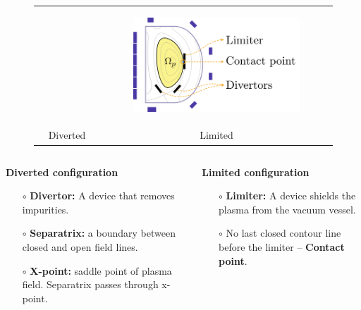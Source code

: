 \documentclass{beamer}
\begin{document}
\begin{frame}[t]
\begin{figure}[H]
\begin{tabular}{cc}
\begin{subfigure}{0.4\textwidth}
        \end{subfigure}
        &
        \begin{subfigure}{0.4\textwidth}
            \includegraphics[height=0.45\linewidth]{ContactPoint}
        \end{subfigure}\\
        Diverted & Limited
        
    \end{tabular}
\end{figure}


\begin{columns}[t]
\hspace{2mm} 
    \begin{column}{0.57\linewidth}
        \textcolor{myred}{\bf Diverted configuration} 

        {\footnotesize
        \begin{itemize}[leftmargin=0pt] 
            \item[$\circ$] {\bf Divertor:} A device that removes impurities.
            \item[$\circ$] {\bf Separatrix:} a boundary between closed and open field lines.
            \item[$\circ$] {\bf X-point:} saddle point of plasma field. Separatrix passes through x-point.
        \end{itemize}
        \par}
    \end{column}

    \begin{column}{0.4\linewidth}
        \textcolor{myred}{\bf Limited configuration} 
        {\footnotesize 
        \begin{itemize}[leftmargin=0pt] 
            \item[$\circ$] {\bf Limiter:} A device shields the plasma from the vacuum vessel.
            \item[$\circ$] No last closed contour line before the limiter -- {\bf Contact point}.
        \end{itemize}
        \par}
    \end{column}
\end{columns}

\end{frame}
\end{document}
